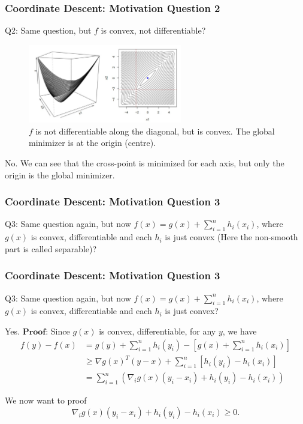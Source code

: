 \begin{frame}
    \frametitle{Coordinate Descent: Motivation Question 2}
Q2: Same question, but $f$ is convex, not differentiable?
\pause
\begin{figure}[!htbp]
    \begin{center}
        \includegraphics[width=0.6\textwidth]{img/cd_q2.png}
    \end{center}
    \caption{$f$ is not differentiable along the diagonal, but is convex. The global minimizer is at the origin (centre).}\label{fig:cd_q2}
\end{figure}

No. We can see that the cross-point is minimized for each axis, but only the origin is the global minimizer.
\end{frame}

\begin{frame}
\frametitle{Coordinate Descent: Motivation Question 3}
Q3: Same question again, but now $f(x)=g(x)+\sum_{i=1}^n h_i\left(x_i\right)$, where $g(x)$ is convex, differentiable and each $h_i$ is just convex (Here the non-smooth part is called separable)?
\end{frame}

\begin{frame}
\frametitle{Coordinate Descent: Motivation Question 3}
Q3: Same question again, but now $f(x)=g(x)+\sum_{i=1}^n h_i\left(x_i\right)$, where $g(x)$ is convex, differentiable and each $h_i$ is just convex?

Yes. $\textbf{Proof}$: Since $g(x)$ is convex, differentiable, for any $y$, we have
\begin{align*}
    f(y)-f(x)&=g(y)+\sum_{i=1}^n h_i\left(y_i\right)-\left[g(x)+\sum_{i=1}^n h_i\left(x_i\right)\right] \\
    &\geq \nabla g(x)^T(y-x)+\sum_{i=1}^n\left[h_i\left(y_i\right)-h_i\left(x_i\right)\right]\\
    &=\sum_{i=1}^n\left(\nabla_i g(x)\left(y_i-x_i\right)+h_i\left(y_i\right)-h_i\left(x_i\right)\right)
\end{align*}

We now want to proof
\begin{equation}
    \nabla_i g(x)\left(y_i-x_i\right)+h_i\left(y_i\right)-h_i\left(x_i\right) \geq 0.
\end{equation}
\end{frame}

